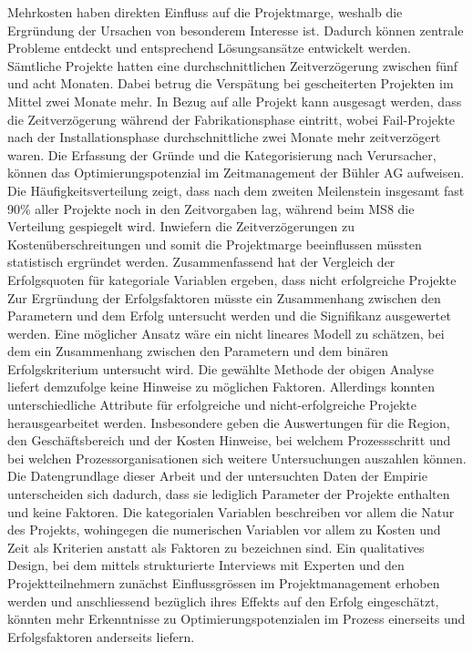 \newline Mehrkosten haben direkten Einfluss auf die Projektmarge, weshalb die Ergründung der Ursachen von besonderem Interesse ist. Dadurch können zentrale Probleme entdeckt und entsprechend Lösungsansätze entwickelt werden. 
\newline\newline
Sämtliche Projekte hatten eine durchschnittlichen Zeitverzögerung zwischen fünf und acht Monaten. Dabei betrug die Verspätung bei gescheiterten Projekten im Mittel zwei Monate mehr. In Bezug auf alle Projekt kann ausgesagt werden, dass die Zeitverzögerung während der Fabrikationsphase eintritt, wobei Fail-Projekte nach der Installationsphase durchschnittliche zwei Monate mehr zeitverzögert waren. Die Erfassung der Gründe und die Kategorisierung nach Verursacher, können das Optimierungspotenzial im Zeitmanagement der Bühler AG aufweisen. Die Häufigkeitsverteilung zeigt, dass nach dem zweiten Meilenstein insgesamt fast 90\% aller Projekte noch in den Zeitvorgaben lag, während beim MS8 die Verteilung gespiegelt wird. Inwiefern die Zeitverzögerungen zu Kostenüberschreitungen und somit die Projektmarge beeinflussen müssten statistisch ergründet werden. 
\newline\newline
Zusammenfassend hat der Vergleich der Erfolgsquoten für kategoriale Variablen ergeben, dass nicht erfolgreiche Projekte 
Zur Ergründung der Erfolgsfaktoren müsste ein Zusammenhang zwischen den Parametern und dem Erfolg untersucht werden und die Signifikanz ausgewertet werden. Eine möglicher Ansatz wäre ein nicht lineares Modell zu schätzen, bei dem ein Zusammenhang zwischen den Parametern und dem binären Erfolgskriterium untersucht wird. Die gewählte Methode der obigen Analyse liefert demzufolge keine Hinweise zu möglichen Faktoren. Allerdings konnten unterschiedliche Attribute für erfolgreiche und nicht-erfolgreiche Projekte herausgearbeitet werden. Insbesondere geben die Auswertungen für die Region, den Geschäftsbereich und der Kosten Hinweise, bei welchem Prozessschritt und bei welchen Prozessorganisationen sich weitere Untersuchungen auszahlen können.
\newline\newline
Die Datengrundlage dieser Arbeit und der untersuchten Daten der Empirie unterscheiden sich dadurch, dass sie lediglich Parameter der Projekte enthalten und keine Faktoren. Die kategorialen Variablen beschreiben vor allem die Natur des Projekts, wohingegen die numerischen Variablen vor allem zu Kosten und Zeit als Kriterien anstatt als Faktoren zu bezeichnen sind. Ein qualitatives Design, bei dem mittels strukturierte Interviews mit Experten und den Projektteilnehmern zunächst Einflussgrössen im Projektmanagement erhoben werden und anschliessend bezüglich ihres Effekts auf den Erfolg eingeschätzt, könnten mehr Erkenntnisse zu Optimierungspotenzialen im Prozess einerseits und Erfolgsfaktoren anderseits liefern. 
